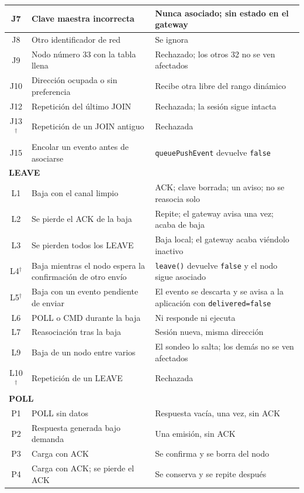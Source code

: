 {\begin{longtable}{|c|p{6.4cm}|p{6.8cm}|}
\hline
J7 & Clave maestra incorrecta & Nunca asociado; sin estado en el gateway \\
\hline
J8 & Otro identificador de red & Se ignora \\
\hline
J9 & Nodo número 33 con la tabla llena & Rechazado; los otros 32 no se ven afectados \\
\hline
J10 & Dirección ocupada o sin preferencia & Recibe otra libre del rango dinámico \\
\hline
J12 & Repetición del último JOIN & Rechazada; la sesión sigue intacta \\
\hline
J13$^{\dagger}$ & Repetición de un JOIN antiguo & Rechazada \\
\hline
J15 & Encolar un evento antes de asociarse & \texttt{queuePushEvent} devuelve \texttt{false} \\
\hline
\multicolumn{3}{|l|}{\textbf{LEAVE}} \\
\hline
L1 & Baja con el canal limpio & ACK; clave borrada; un aviso; no se reasocia solo \\
\hline
L2 & Se pierde el ACK de la baja & Repite; el gateway avisa una vez; acaba de baja \\
\hline
L3 & Se pierden todos los LEAVE & Baja local; el gateway acaba viéndolo inactivo \\
\hline
L4$^{\dagger}$ & Baja mientras el nodo espera la confirmación de otro envío & \texttt{leave()} devuelve \texttt{false} y el nodo sigue asociado \\
\hline
L5$^{\dagger}$ & Baja con un evento pendiente de enviar & El evento se descarta y se avisa a la aplicación con \texttt{delivered=false} \\
\hline
L6 & POLL o CMD durante la baja & Ni responde ni ejecuta \\
\hline
L7 & Reasociación tras la baja & Sesión nueva, misma dirección \\
\hline
L9 & Baja de un nodo entre varios & El sondeo lo salta; los demás no se ven afectados \\
\hline
L10$^{\dagger}$ & Repetición de un LEAVE & Rechazada \\
\hline
\multicolumn{3}{|l|}{\textbf{POLL}} \\
\hline
P1 & POLL sin datos & Respuesta vacía, una vez, sin ACK \\
\hline
P2 & Respuesta generada bajo demanda & Una emisión, sin ACK \\
\hline
P3 & Carga con ACK & Se confirma y se borra del nodo \\
\hline
P4 & Carga con ACK; se pierde el ACK & Se conserva y se repite después \\

\end{longtable}}
